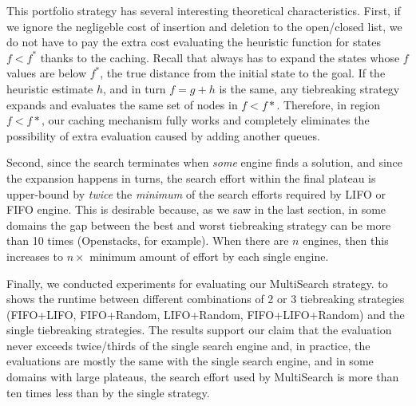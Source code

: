This portfolio strategy has several interesting theoretical characteristics. First, if we ignore the negligeble cost of insertion and deletion to the open/closed list, we do not have to pay the extra cost evaluating the heuristic function for states $f<f^*$ thanks to the caching.
Recall that \astar always has to expand the states whose $f$ values are below $f^*$, the true distance from the initial state to the goal. If the heuristic estimate $h$, and in turn $f=g+h$ is the same, any tiebreaking strategy expands and evaluates the same set of nodes in $f<f*$.
Therefore, in region $f<f*$, our caching mechanism fully works and completely eliminates the possibility of extra evaluation caused by adding another queues.

Second, since the search terminates when \emph{some} engine finds a solution, and since the expansion happens in turns, the search effort within the final plateau is upper-bound by \emph{twice} the \emph{minimum} of the search efforts required by LIFO or FIFO engine. This is desirable because, as we saw in the last section, in some domains the gap between the best and worst tiebreaking strategy can be more than 10 times (Openstacks, for example).
When there are $n$ engines, then this increases to $n\times$ minimum amount of effort by each single engine.

Finally, we conducted experiments for evaluating our MultiSearch strategy.
 to  shows the runtime between different combinations of 2 or 3 tiebreaking strategies (FIFO+LIFO, FIFO+Random, LIFO+Random, FIFO+LIFO+Random) and the single tiebreaking strategies. The results support our claim that the evaluation never exceeds twice/thirds of the single search engine and, in practice, the evaluations are mostly the same with the single search engine, and in some domains with large plateaus, the search effort used by MultiSearch is more than ten times less than by the single strategy.

